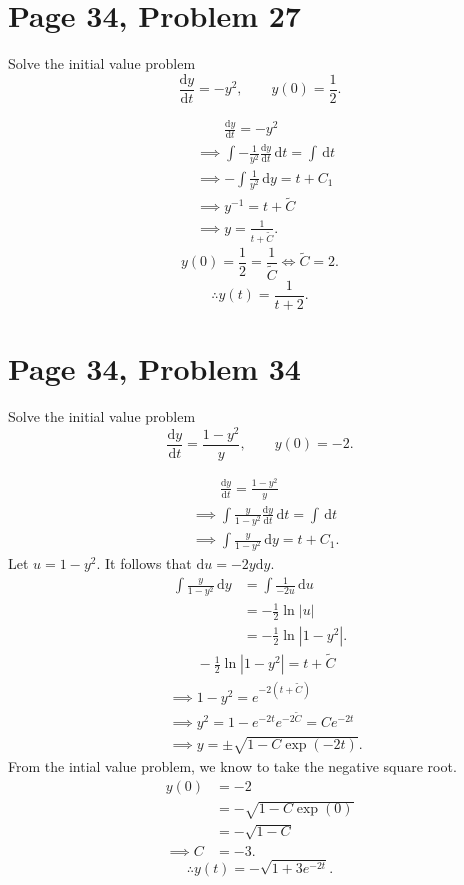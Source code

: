 \documentclass[11pt, letterpaper]{report}
\begin{document}
\section*{Page 34, Problem 27}
Solve the initial value problem
\[
	\frac{\mathrm{d}y}{\mathrm{d}t} =-y^2,\qquad y(0)=\frac{1}{2}
.\]
\begin{solution}
	\begin{align*}
		&\qquad \frac{\mathrm{d}y}{\mathrm{d}t} =-y^2\\
		&\implies \int -\frac{1}{y^2}\frac{\mathrm{d}y}{\mathrm{d}t}  \,\mathrm{d} t=\int  \,\mathrm{d} t\\
		&\implies -\int \frac{1}{y^2} \,\mathrm{d} y=t+C_1\\
		&\implies y^{-1}=t+\tilde{C}\\
		&\implies y=\frac{1}{t+\tilde{C}}
	.\end{align*}
	\[
		y(0)=\frac{1}{2}=\frac{1}{\tilde{C}} \iff \tilde{C}=2
	.\]
	\[
		\therefore y(t)=\frac{1}{t+2}
	.\]
\end{solution}
\section*{Page 34, Problem 34}
Solve the initial value problem
\[
	\frac{\mathrm{d}y}{\mathrm{d}t} =\frac{1-y^2}{y},\qquad y(0)=-2
.\]
\begin{solution}
	\begin{align*}
		&\qquad\frac{\mathrm{d}y}{\mathrm{d}t} =\frac{1-y^2}{y}\\
		&\implies \int \frac{y}{1-y^2}\frac{\mathrm{d}y}{\mathrm{d}t}  \,\mathrm{d} t=\int  \,\mathrm{d} t\\
		&\implies \int \frac{y}{1-y^2} \,\mathrm{d} y=t+C_1
	.\end{align*}
	Let $u=1-y^2$. It follows that $\mathrm{d} u=-2y\mathrm{d} y$.
	\begin{align*}
		\int \frac{y}{1-y^2} \,\mathrm{d} y&=\int \frac{1}{-2u}\,\mathrm{d} u\\
						   &=-\frac{1}{2}\ln \left| u \right| \\
						   &=-\frac{1}{2}\ln \left| 1-y^2 \right| 
	.\end{align*}
	\begin{align*}
		&\qquad-\frac{1}{2}\ln \left| 1-y^2 \right| =t+\tilde{C}\\
		&\implies 1-y^2=e^{-2(t+\tilde{C})}\\
		&\implies y^2=1-e^{-2t}e^{-2\tilde{C}}=Ce^{-2t}\\
		&\implies y=\pm \sqrt{1-C\exp (-2t)} 
	.\end{align*}
	From the intial value problem, we know to take the negative square root.
	\begin{align*}
		y(0)&=-2\\
		    &=-\sqrt{1-C\exp (0)} \\
		    &=-\sqrt{1-C} \\
		\implies C&=-3.
	\end{align*}
	\[
		\therefore y(t)=-\sqrt{1+3e^{-2t}} 
	.\]
\end{solution}
\end{document}
